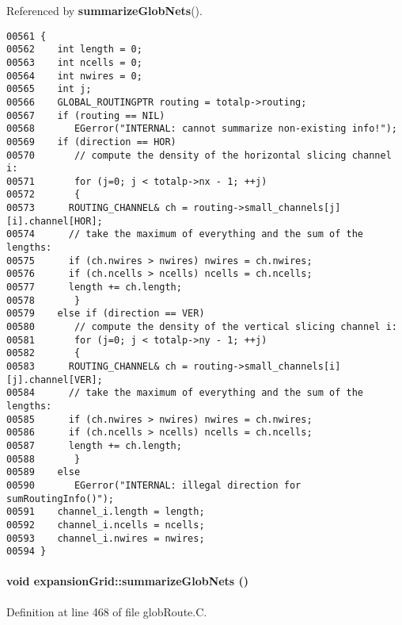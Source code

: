 Referenced by {\bf summarize\-Glob\-Nets}().\small\begin{verbatim}00561 {
00562    int length = 0;
00563    int ncells = 0;
00564    int nwires = 0;
00565    int j;
00566    GLOBAL_ROUTINGPTR routing = totalp->routing;
00567    if (routing == NIL)
00568       EGerror("INTERNAL: cannot summarize non-existing info!");
00569    if (direction == HOR)
00570       // compute the density of the horizontal slicing channel i:
00571       for (j=0; j < totalp->nx - 1; ++j)
00572       {
00573      ROUTING_CHANNEL& ch = routing->small_channels[j][i].channel[HOR];
00574      // take the maximum of everything and the sum of the lengths:
00575      if (ch.nwires > nwires) nwires = ch.nwires;
00576      if (ch.ncells > ncells) ncells = ch.ncells;
00577      length += ch.length;
00578       }
00579    else if (direction == VER)
00580       // compute the density of the vertical slicing channel i:
00581       for (j=0; j < totalp->ny - 1; ++j)
00582       {
00583      ROUTING_CHANNEL& ch = routing->small_channels[i][j].channel[VER];
00584      // take the maximum of everything and the sum of the lengths:
00585      if (ch.nwires > nwires) nwires = ch.nwires;
00586      if (ch.ncells > ncells) ncells = ch.ncells;
00587      length += ch.length;
00588       }
00589    else
00590       EGerror("INTERNAL: illegal direction for sumRoutingInfo()");
00591    channel_i.length = length;
00592    channel_i.ncells = ncells;
00593    channel_i.nwires = nwires;
00594 }
\end{verbatim}\normalsize 
\label{expansionGrid_a6}
\paragraph{\setlength{\rightskip}{0pt plus 5cm}void expansion\-Grid::summarize\-Glob\-Nets ()}\hfill



Definition at line 468 of file glob\-Route.C.

